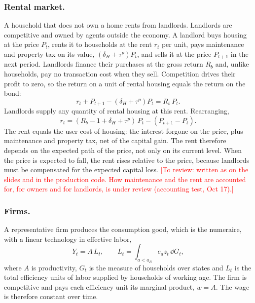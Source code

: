 \subsubsection*{Rental market.}
A household that does not own a home rents from landlords. Landlords are
competitive and owned by agents outside the economy. A landlord buys housing
at the price $P_t$, rents it to households at the rent $r_t$ per unit, pays
maintenance and property tax on its value, $(\delta_H+\tau^p)P_t$, and sells
it at the price $P_{t+1}$ in the next period. Landlords finance their
purchases at the gross return $R_b$ and, unlike households, pay no
transaction cost when they sell. Competition drives their profit to zero, so
the return on a unit of rental housing equals the return on the bond:
\begin{equation}
 r_t+P_{t+1}-(\delta_H+\tau^p)P_t=R_b\,P_t .
 \label{eq:m-rent}
\end{equation}
Landlords supply any quantity of rental housing at this rent. Rearranging,
\begin{equation*}
 r_t=(R_b-1+\delta_H+\tau^p)\,P_t-(P_{t+1}-P_t).
\end{equation*}
The rent equals the user cost of housing: the interest forgone on the price,
plus maintenance and property tax, net of the capital gain. The rent
therefore depends on the expected path of the price, not only on its current
level. When the price is expected to fall, the rent rises relative to the
price, because landlords must be compensated for the expected capital loss. \textcolor{red}{[To review: written as on the slides and in the production
code. How maintenance and the rent are accounted for, for owners and for
landlords, is under review (accounting test, Oct 17).]}

\subsubsection*{Firms.}
A representative firm produces the consumption good, which is the numeraire,
with a linear technology in effective labor,
\begin{equation*}
 Y_t=A\,L_t,\qquad L_t=\int_{a<a_R}e_az_t\,\dd G_t,
\end{equation*}
where $A$ is productivity, $G_t$ is the measure of households over states and
$L_t$ is the total efficiency units of labor supplied by households of working
age. The firm is competitive and pays each efficiency unit its marginal
product, $w=A$. The wage is therefore constant over time.


